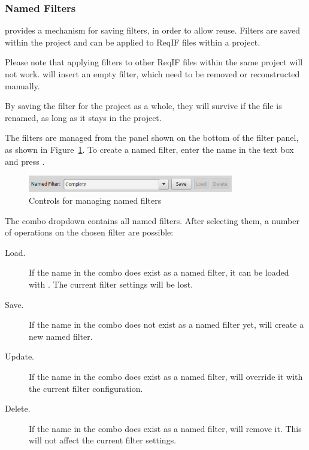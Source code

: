 
\subsubsection{Named Filters}
\label{sec:named-filters}

\pror{} provides a mechanism for saving filters, in order to allow reuse. Filters are saved within the project and can be applied to ReqIF files within a project.

\begin{warning}
Please note that applying filters to other ReqIF files within the same project will not
work. \pror{} will insert an empty filter, which need to be removed or reconstructed manually.
\end{warning}

By saving the filter for the project as a whole, they will survive if the file is renamed, as long as it stays in the project.

The filters are managed from the panel shown on the bottom of the filter panel, as shown in Figure~\ref{fig:named_filter}. To create a named filter, enter the name in the text box and press .

\begin{figure}
  \centering
  \includegraphics[width=0.8\textwidth]{../rmf-images/reqif_search_3.png}
  \caption{Controls for managing named filters}
  \label{fig:named_filter}
\end{figure}

The combo dropdown contains all named filters. After selecting them, a number of operations on the chosen filter are possible:

\begin{description}
\item[Load.] If the name in the combo does exist as a named filter, it can be loaded with . The current filter settings will be lost.
\item[Save.] If the name in the combo does not exist as a named filter yet,  will create a new named filter.
\item[Update.] If the name in the combo does exist as a named filter,  will override it with the current filter configuration.
\item[Delete.] If the name in the combo does exist as a named filter,  will remove it. This will not affect the current filter settings.
\end{description}

